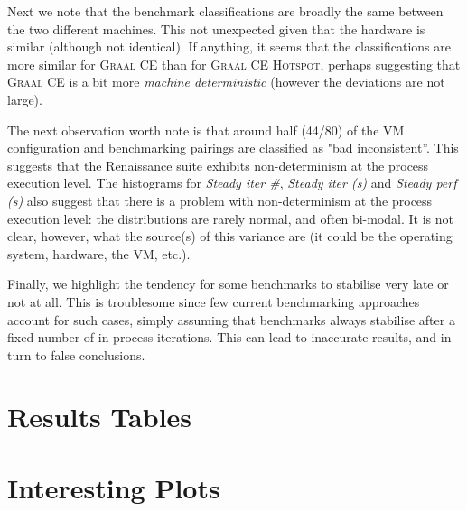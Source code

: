 \documentclass[a4paper]{article}
\newcommand{\graalce}{\textsc{Graal CE}\xspace}
\newcommand{\graalcehs}{\textsc{Graal CE Hotspot}\xspace}
\newcommand{\bencherseven}{Linux$_\mathrm{1240v5}$\xspace}
\newcommand{\bencherten}{Linux$_\mathrm{1240v6}$\xspace}
\begin{document}
Next we note that the benchmark classifications are broadly the same between
the two different machines. This not unexpected given that the hardware is
similar (although not identical). If anything, it seems that the
classifications are more similar for \graalce than for \graalcehs, perhaps
suggesting that \graalce is a bit more \emph{machine deterministic} (however
the deviations are not large).

The next observation worth note is that around half (44/80) of the VM
configuration and benchmarking pairings are classified as "bad inconsistent''.
This suggests that the Renaissance suite exhibits non-determinism at the
process execution level. The histograms for \emph{Steady iter \#}, \emph{Steady
iter (s)} and \emph{Steady perf (s)} also suggest that there is a problem with
non-determinism at the process execution level: the distributions are rarely
normal, and often bi-modal. It is not clear, however, what the source(s) of
this variance are (it could be the operating system, hardware, the VM, etc.).

Finally, we highlight the tendency for some benchmarks to stabilise very late
or not at all. This is troublesome since few current benchmarking approaches
account for such cases, simply assuming that benchmarks always stabilise after
a fixed number of in-process iterations. This can lead to inaccurate results,
and in turn to false conclusions.




\appendix

\section{Results Tables}


\newcommand{\captionbsevengraalce}{Results for \graalce on \bencherseven.}


\newpage
\newcommand{\captionbsevengraalcehs}{Results for \graalcehs on \bencherseven.}


\newpage
\newcommand{\captionbtengraalce}{Results for \graalce on \bencherten.}


\newpage
\newcommand{\captionbtengraalcehs}{Results for \graalcehs on \bencherten.}


\section{Interesting Plots}

\end{document}
